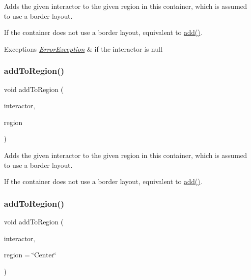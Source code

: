 Adds the given interactor to the given region in this container, which is assumed to use a border layout. 

If the container does not use a border layout, equivalent to \mbox{\hyperlink{classGContainer_a6f99b7c841256dbdc5acaafbbca4e685}{add()}}. 
\begin{DoxyExceptions}{Exceptions}
{\em \mbox{\hyperlink{classErrorException}{Error\+Exception}}} & if the interactor is null \\
\hline
\end{DoxyExceptions}
\mbox{\label{classGContainer_ad05df0d92ab2fba95d401a5614365558}} 
\subsubsection{\texorpdfstring{add\+To\+Region()}{addToRegion()}\hspace{0.1cm}{\footnotesize\ttfamily [3/4]}}
{\footnotesize\ttfamily void add\+To\+Region (\begin{DoxyParamCaption}\item[{\mbox{\hyperlink{classGInteractor}{G\+Interactor}} \&}]{interactor,  }\item[{\mbox{\hyperlink{classGContainer_a81a01a86de31071a92e6cce0bab9bc4b}{Region}}}]{region }\end{DoxyParamCaption})\hspace{0.3cm}{\ttfamily [virtual]}}



Adds the given interactor to the given region in this container, which is assumed to use a border layout. 

If the container does not use a border layout, equivalent to \mbox{\hyperlink{classGContainer_a6f99b7c841256dbdc5acaafbbca4e685}{add()}}. \mbox{\label{classGContainer_a667ed0065e0bbb52a893904e7f2383bb}} 
\subsubsection{\texorpdfstring{add\+To\+Region()}{addToRegion()}\hspace{0.1cm}{\footnotesize\ttfamily [4/4]}}
{\footnotesize\ttfamily void add\+To\+Region (\begin{DoxyParamCaption}\item[{\mbox{\hyperlink{classGInteractor}{G\+Interactor}} \&}]{interactor,  }\item[{const std\+::string \&}]{region = {\ttfamily \char`\"{}Center\char`\"{}} }\end{DoxyParamCaption})\hspace{0.3cm}{\ttfamily [virtual]}}



